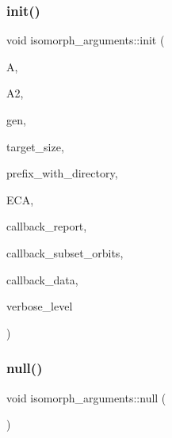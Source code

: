\subsubsection{\texorpdfstring{init()}{init()}}
{\footnotesize\ttfamily void isomorph\+\_\+arguments\+::init (\begin{DoxyParamCaption}\item[{\mbox{\hyperlink{classaction}{action}} $\ast$}]{A,  }\item[{\mbox{\hyperlink{classaction}{action}} $\ast$}]{A2,  }\item[{\mbox{\hyperlink{classgenerator}{generator}} $\ast$}]{gen,  }\item[{\mbox{\hyperlink{galois_8h_a09fddde158a3a20bd2dcadb609de11dc}{I\+NT}}}]{target\+\_\+size,  }\item[{const \mbox{\hyperlink{galois_8h_ab6cc7b4aeb6ea31aba2b3fbfc83ff5e6}{B\+Y\+TE}} $\ast$}]{prefix\+\_\+with\+\_\+directory,  }\item[{\mbox{\hyperlink{classexact__cover__arguments}{exact\+\_\+cover\+\_\+arguments}} $\ast$}]{E\+CA,  }\item[{void($\ast$)(\mbox{\hyperlink{classisomorph}{isomorph}} $\ast$Iso, void $\ast$data, \mbox{\hyperlink{galois_8h_a09fddde158a3a20bd2dcadb609de11dc}{I\+NT}} \mbox{\hyperlink{simeon_8_c_a818073fbcc2f439e7c56952f67386122}{verbose\+\_\+level}})}]{callback\+\_\+report,  }\item[{void($\ast$)(\mbox{\hyperlink{classisomorph}{isomorph}} $\ast$Iso, void $\ast$data, \mbox{\hyperlink{galois_8h_a09fddde158a3a20bd2dcadb609de11dc}{I\+NT}} \mbox{\hyperlink{simeon_8_c_a818073fbcc2f439e7c56952f67386122}{verbose\+\_\+level}})}]{callback\+\_\+subset\+\_\+orbits,  }\item[{void $\ast$}]{callback\+\_\+data,  }\item[{\mbox{\hyperlink{galois_8h_a09fddde158a3a20bd2dcadb609de11dc}{I\+NT}}}]{verbose\+\_\+level }\end{DoxyParamCaption})}

\mbox{\label{classisomorph__arguments_afa55a961ada1e13cb3b9a2e9fb035050}} 
\subsubsection{\texorpdfstring{null()}{null()}}
{\footnotesize\ttfamily void isomorph\+\_\+arguments\+::null (\begin{DoxyParamCaption}{ }\end{DoxyParamCaption})}

